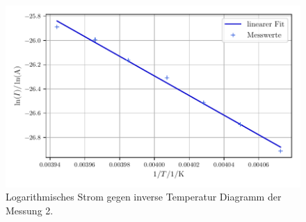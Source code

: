 \begin{figure}
    \centering
    \includegraphics[width=0.8\linewidth]{scripts/build/plot2_1.pdf}
    \caption{Logarithmisches Strom gegen inverse Temperatur Diagramm der Messung 2.}
    \label{fig:W1_2}
\end{figure}

